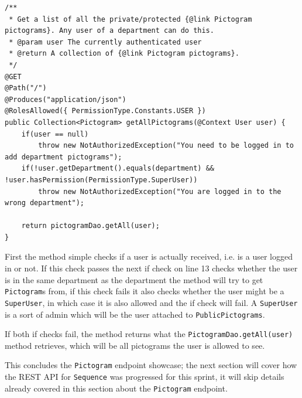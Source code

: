 \begin{lstlisting}[float, floatplacement=h, caption={A GET request to get all pictograms for a department.},label={lst:getallPictograms}]
/**
 * Get a list of all the private/protected {@link Pictogram pictograms}. Any user of a department can do this.
 * @param user The currently authenticated user
 * @return A collection of {@link Pictogram pictograms}.
 */
@GET
@Path("/")
@Produces("application/json")
@RolesAllowed({ PermissionType.Constants.USER })
public Collection<Pictogram> getAllPictograms(@Context User user) {
    if(user == null)
        throw new NotAuthorizedException("You need to be logged in to add department pictograms");
    if(!user.getDepartment().equals(department) && !user.hasPermission(PermissionType.SuperUser))
        throw new NotAuthorizedException("You are logged in to the wrong department");

    return pictogramDao.getAll(user);
}
\end{lstlisting}

First the method simple checks if a user is actually received, i.e. is a user logged in or not.
If this check passes the next if check on line 13 checks whether the user is in the same department as the department the method will try to get \texttt{Pictogram}s from, if this check fails it also checks whether the user might be a \texttt{SuperUser}, in which case it is also allowed and the if check will fail.
A \texttt{SuperUser} is a sort of admin which will be the user attached to \texttt{PublicPictograms}.

If both if checks fail, the method returns what the \texttt{PictogramDao.getAll(user)} method retrieves, which will be all pictograms the user is allowed to see.

This concludes the \texttt{Pictogram} endpoint showcase; the next section will cover how the REST API for \texttt{Sequence} was progressed for this sprint, it will skip details already covered in this section about the \texttt{Pictogram} endpoint.

